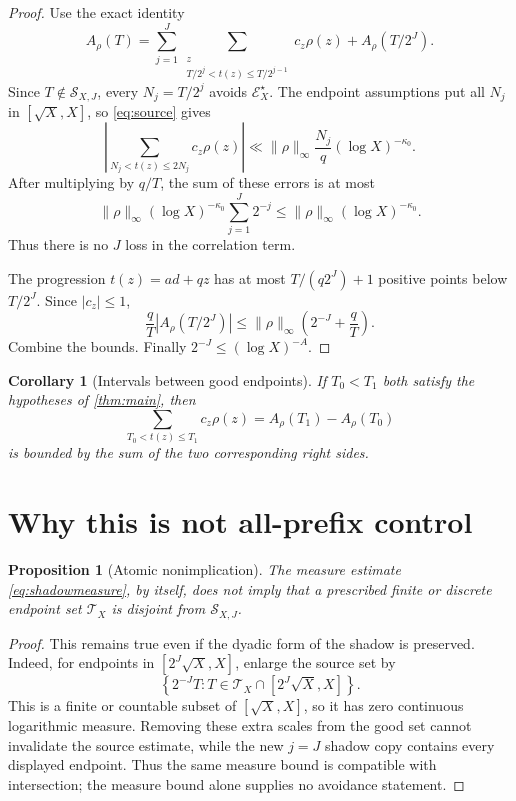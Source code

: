 \documentclass[11pt]{article}
\newtheorem{proposition}[theorem]{Proposition}
\newtheorem{corollary}[theorem]{Corollary}
\theoremstyle{definition}
\newcommand{\E}{\mathcal E}
\newcommand{\Sshadow}{\mathcal S}
\newcommand{\norm}[1]{\lVert#1\rVert}
\begin{document}
\begin{proof}
Use the exact identity
\begin{equation}
 A_\rho(T)=
 \sum_{j=1}^J
 \sum_{\substack{z\\T/2^j<t(z)\le T/2^{j-1}}}
 c_z\rho(z)
 +A_\rho(T/2^J).
\label{eq:telescoping}
\end{equation}
Since \(T\notin\Sshadow_{X,J}\), every
\(N_j=T/2^j\) avoids \(\E_X^\star\).  The endpoint assumptions put
all \(N_j\) in \([\sqrt X,X]\), so \eqref{eq:source} gives
\[
 \left|
 \sum_{N_j<t(z)\le2N_j}c_z\rho(z)\right|
 \ll\norm{\rho}_\infty\frac{N_j}{q}
 (\log X)^{-\kappa_0}.
\]
After multiplying by \(q/T\), the sum of these errors is at most
\[
 \norm{\rho}_\infty(\log X)^{-\kappa_0}
 \sum_{j=1}^J2^{-j}
 \le\norm{\rho}_\infty(\log X)^{-\kappa_0}.
\]
Thus there is no \(J\) loss in the correlation term.

The progression \(t(z)=ad+qz\) has at most
\(T/(q2^J)+1\) positive points below \(T/2^J\).  Since
\(|c_z|\le1\),
\[
 \frac qT|A_\rho(T/2^J)|
 \le\norm{\rho}_\infty\left(2^{-J}+\frac qT\right).
\]
Combine the bounds.  Finally
\(2^{-J}\le(\log X)^{-A}\).
\end{proof}

\begin{corollary}[Intervals between good endpoints]\label{cor:interval}
If \(T_0<T_1\) both satisfy the hypotheses of \cref{thm:main}, then
\[
 \sum_{T_0<t(z)\le T_1}c_z\rho(z)
 =A_\rho(T_1)-A_\rho(T_0)
\]
is bounded by the sum of the two corresponding right sides.
\end{corollary}

\section{Why this is not all-prefix control}

\begin{proposition}[Atomic nonimplication]\label{prop:atomic}
The measure estimate \eqref{eq:shadowmeasure}, by itself, does not
imply that a prescribed finite or discrete endpoint set
\(\mathcal T_X\) is disjoint from \(\Sshadow_{X,J}\).
\end{proposition}

\begin{proof}
This remains true even if the dyadic form of the shadow is preserved.
Indeed, for endpoints in
\([2^J\sqrt X,X]\), enlarge the source set by
\[
 \left\{2^{-J}T:
 T\in\mathcal T_X\cap[2^J\sqrt X,X]\right\}.
\]
This is a finite or countable subset of \([\sqrt X,X]\), so it has
zero continuous logarithmic measure.  Removing these extra scales
from the good set cannot invalidate the source estimate, while the
new \(j=J\) shadow copy contains every displayed endpoint.  Thus the
same measure bound is compatible with intersection; the measure
bound alone supplies no avoidance statement.
\end{proof}
\end{document}
